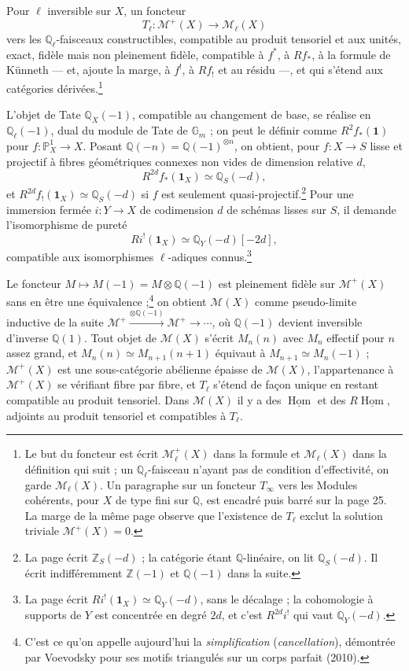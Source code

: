 \documentclass[11pt,a4paper]{article}
\begin{document}
Pour $\ell$ inversible sur $X$, un foncteur
\[
T_{\ell} \colon \mathcal{M}^{+}(X) \longrightarrow \mathcal{M}_{\ell}(X)
\]
vers les $\mathbb{Q}_{\ell}$-faisceaux constructibles, compatible au produit
tensoriel et aux unités, exact, fidèle mais non pleinement fidèle, compatible à
$f^{*}$, à $Rf_{*}$, à la formule de Künneth --- et, ajoute la marge, à $f^{!}$,
à $Rf_{!}$ et au résidu ---, et qui s'étend aux catégories
dérivées.\footnote{Le but du foncteur est écrit $\mathcal{M}^{+}_{\ell}(X)$ dans
la formule et $\mathcal{M}_{\ell}(X)$ dans la définition qui suit ; un
$\mathbb{Q}_{\ell}$-faisceau n'ayant pas de condition d'effectivité, on garde
$\mathcal{M}_{\ell}(X)$. Un paragraphe sur un foncteur $T_{\infty}$ vers les Modules
cohérents, pour $X$ de type fini sur $\mathbb{Q}$, est encadré puis barré sur la
page 25. La marge de la même page observe que l'existence de $T_{\ell}$ exclut
la solution triviale $\mathcal{M}^{+}(X) = 0$.}

L'objet de Tate $\mathbb{Q}_{X}(-1)$, compatible au changement de base, se
réalise en $\mathbb{Q}_{\ell}(-1)$, dual du module de Tate de $\mathbb{G}_{m}$ ;
on peut le définir comme $R^{2}f_{*}(\mathbf{1})$ pour $f \colon
\mathbb{P}^{1}_{X} \to X$. Posant $\mathbb{Q}(-n) = \mathbb{Q}(-1)^{\otimes n}$,
on obtient, pour $f \colon X \to S$ lisse et projectif à fibres géométriques
connexes non vides de dimension relative $d$,
\[
R^{2d}f_{*}(\mathbf{1}_{X}) \simeq \mathbb{Q}_{S}(-d) ,
\]
et $R^{2d}f_{!}(\mathbf{1}_{X}) \simeq \mathbb{Q}_{S}(-d)$ si $f$ est seulement
quasi-projectif.\footnote{La page écrit $\mathbb{Z}_{S}(-d)$ ; la catégorie
étant $\mathbb{Q}$-linéaire, on lit $\mathbb{Q}_{S}(-d)$. Il écrit indifféremment
$\mathbb{Z}(-1)$ et $\mathbb{Q}(-1)$ dans la suite.} Pour une immersion fermée
$i \colon Y \to X$ de codimension $d$ de schémas lisses sur $S$, il demande
l'isomorphisme de pureté
\[
Ri^{!}(\mathbf{1}_{X}) \simeq \mathbb{Q}_{Y}(-d)[-2d] ,
\]
compatible aux isomorphismes $\ell$-adiques connus.\footnote{La page écrit
$Ri^{!}(\mathbf{1}_{X}) \simeq \mathbb{Q}_{Y}(-d)$, sans le décalage ; la
cohomologie à supports de $Y$ est concentrée en degré $2d$, et c'est
$R^{2d}i^{!}$ qui vaut $\mathbb{Q}_{Y}(-d)$.}

Le foncteur $M \mapsto M(-1) = M \otimes \mathbb{Q}(-1)$ est pleinement fidèle
sur $\mathcal{M}^{+}(X)$ sans en être une équivalence ;\footnote{C'est ce qu'on
appelle aujourd'hui la \emph{simplification} (\emph{cancellation}), démontrée par
Voevodsky pour ses motifs triangulés sur un corps parfait (2010).} on obtient
$\mathcal{M}(X)$ comme pseudo-limite inductive de la suite $\mathcal{M}^{+}
\xrightarrow{\otimes\mathbb{Q}(-1)} \mathcal{M}^{+} \to \cdots$, où
$\mathbb{Q}(-1)$ devient inversible d'inverse $\mathbb{Q}(1)$. Tout objet de
$\mathcal{M}(X)$ s'écrit $M_{n}(n)$ avec $M_{n}$ effectif pour $n$ assez grand,
et $M_{n}(n) \simeq M_{n+1}(n+1)$ équivaut à $M_{n+1} \simeq M_{n}(-1)$ ;
$\mathcal{M}^{+}(X)$ est une sous-catégorie abélienne épaisse de $\mathcal{M}(X)$,
l'appartenance à $\mathcal{M}^{+}(X)$ se vérifiant fibre par fibre, et
$T_{\ell}$ s'étend de façon unique en restant compatible au produit tensoriel. Dans $\mathcal{M}(X)$ il y a des
$\underline{\operatorname{Hom}}$ et des $R\underline{\operatorname{Hom}}$, adjoints
au produit tensoriel et compatibles à $T_{\ell}$.
\end{document}
